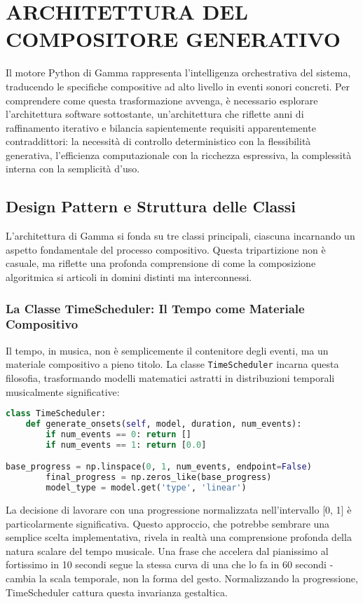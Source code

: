 
\section{ARCHITETTURA DEL COMPOSITORE GENERATIVO}
Il motore Python di Gamma rappresenta l'intelligenza orchestrativa del sistema, traducendo le specifiche compositive ad alto livello in eventi sonori concreti. Per comprendere come questa trasformazione avvenga, è necessario esplorare l'architettura software sottostante, un'architettura che riflette anni di raffinamento iterativo e bilancia sapientemente requisiti apparentemente contraddittori: la necessità di controllo deterministico con la flessibilità generativa, l'efficienza computazionale con la ricchezza espressiva, la complessità interna con la semplicità d'uso.
\subsection{Design Pattern e Struttura delle Classi}
L'architettura di Gamma si fonda su tre classi principali, ciascuna incarnando un aspetto fondamentale del processo compositivo. Questa tripartizione non è casuale, ma riflette una profonda comprensione di come la composizione algoritmica si articoli in domini distinti ma interconnessi.
\subsubsection{La Classe TimeScheduler: Il Tempo come Materiale Compositivo}
Il tempo, in musica, non è semplicemente il contenitore degli eventi, ma un materiale compositivo a pieno titolo. La classe \texttt{TimeScheduler} incarna questa filosofia, trasformando modelli matematici astratti in distribuzioni temporali musicalmente significative:

\begin{lstlisting}[language=Python]
class TimeScheduler:
    def generate_onsets(self, model, duration, num_events):
        if num_events == 0: return []
        if num_events == 1: return [0.0]

base_progress = np.linspace(0, 1, num_events, endpoint=False)
        final_progress = np.zeros_like(base_progress)
        model_type = model.get('type', 'linear')
\end{lstlisting}

La decisione di lavorare con una progressione normalizzata nell'intervallo [0, 1] è particolarmente significativa. Questo approccio, che potrebbe sembrare una semplice scelta implementativa, rivela in realtà una comprensione profonda della natura scalare del tempo musicale. Una frase che accelera dal pianissimo al fortissimo in 10 secondi segue la stessa curva di una che lo fa in 60 secondi - cambia la scala temporale, non la forma del gesto. Normalizzando la progressione, TimeScheduler cattura questa invarianza gestaltica.

